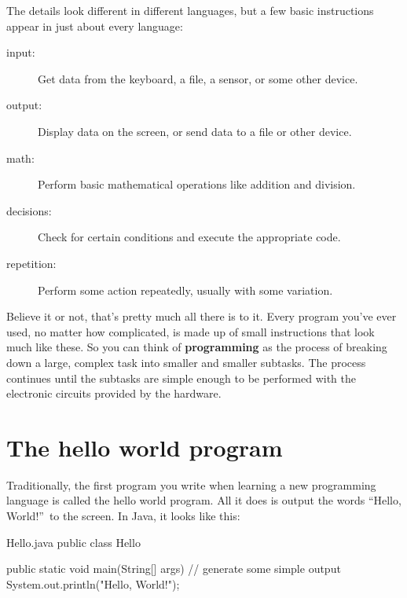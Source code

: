 The details look different in different languages, but a few basic instructions appear in just about every language:

\begin{description}
\item[input:] Get data from the keyboard, a file, a sensor, or some other device.
\item[output:] Display data on the screen, or send data to a file or other device.
\item[math:] Perform basic mathematical operations like addition and division.
\item[decisions:] Check for certain conditions and execute the appropriate code.
\item[repetition:] Perform some action repeatedly, usually with some variation.
\end{description}


Believe it or not, that's pretty much all there is to it.
Every program you've ever used, no matter how complicated, is made up of small instructions that look much like these.
So you can think of {\bf programming} as the process of breaking down a large, complex task into smaller and smaller subtasks.
The process continues until the subtasks are simple enough to be performed with the electronic circuits provided by the hardware.


\section{The hello world program}
\label{hello}


Traditionally, the first program you write when learning a new programming language is called the hello world program.
All it does is output the words ``Hello, World!''\ to the screen.
In Java, it looks like this:


\begin{trinket}[235]{Hello.java}
public class Hello {

    public static void main(String[] args) {
        // generate some simple output
        System.out.println("Hello, World!");
    }
}
\end{trinket}

